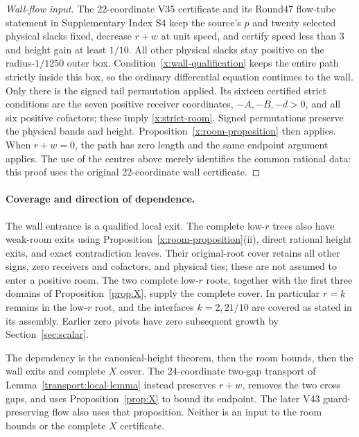 \documentclass[11pt,reqno]{amsart}
\theoremstyle{definition}
\theoremstyle{remark}
\begin{document}
\begin{proof}[Wall-flow input]
The 22-coordinate V35 certificate and its Round47 flow-tube statement
in Supplementary Index S4 keep the source's \(p\) and twenty
selected physical slacks fixed, decrease \(r+w\) at unit speed,
and certify speed less than 3 and height gain at least \(1/10\).
All other physical slacks stay positive on the radius-\(1/1250\)
outer box.  Condition~\eqref{x:wall-qualification} keeps the entire
path strictly inside this box, so the ordinary differential equation
continues to the wall.  Only there is the signed tail permutation
applied.  Its sixteen certified strict conditions are the seven
positive receiver coordinates, \(-A,-B,-d>0\), and all six positive
cofactors; these imply \eqref{x:strict-room}.  Signed permutations
preserve the physical bands and height.  Proposition~\ref{x:room-proposition}
then applies.  When \(r+w=0\), the path has zero length and the
same endpoint argument applies.  The use of the centres above merely
identifies the common rational data: this proof uses the original
22-coordinate wall certificate.
\end{proof}

\paragraph{Coverage and direction of dependence.}
The wall entrance is a qualified local exit.  The complete low-\(r\)
trees also have weak-room exits using
Proposition~\ref{x:room-proposition}\textup{(ii)}, direct rational
height exits, and exact contradiction leaves.  Their original-root
cover retains all other signs, zero receivers and cofactors, and
physical ties; these are not assumed to enter a positive room.
The two complete low-\(r\) roots, together with the first three
domains of Proposition~\ref{prop:X}, supply the complete cover.
In particular \(r=k\) remains in the low-\(r\) root, and the
interfaces \(k=2,21/10\) are covered as stated in its assembly.
Earlier zero pivots have zero subsequent growth by
Section~\ref{sec:scalar}.

The dependency is the canonical-height theorem, then the room bounds,
then the wall exits and complete \(X\) cover.  The 24-coordinate
two-gap transport of Lemma~\ref{transport:local-lemma} instead
preserves \(r+w\), removes the two cross gaps, and uses
Proposition~\ref{prop:X} to bound its endpoint.  The later V43
guard-preserving flow also uses that proposition.  Neither is an
input to the room bounds or the complete \(X\) certificate.
\end{document}
